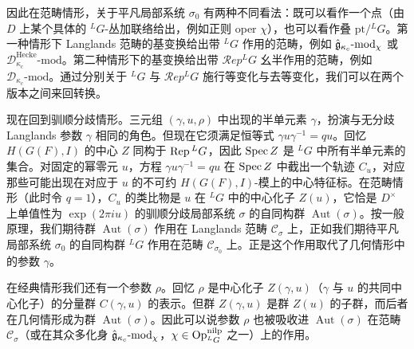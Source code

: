 因此在范畴情形，关于平凡局部系统 $\sigma_0$ 有两种不同看法：既可以看作一个点（由 $D$ 上某个具体的 ${}^L G$-丛加联络给出，例如正则 oper $\chi$），也可以看作叠 $\mathrm{pt}/{}^L G$。第一种情形下 Langlands 范畴的基变换给出带 ${}^L G$ 作用的范畴，例如 $\hat{\mathfrak{g}}_{\kappa_c}\text{-}\mathrm{mod}_\chi$ 或 $\mathcal{D}^{\mathrm{Hecke}}_{\kappa_c}\text{-}\mathrm{mod}$。第二种情形下的基变换给出带 $\mathcal{R}ep{}^L G$ 幺半作用的范畴，例如 $\mathcal{D}_{\kappa_c}\text{-}\mathrm{mod}$。通过分别关于 ${}^L G$ 与 $\mathcal{R}ep{}^L G$ 施行等变化与去等变化，我们可以在两个版本之间来回转换。

现在回到驯顺分歧情形。三元组 $(\gamma,u,\rho)$ 中出现的半单元素 $\gamma$，扮演与无分歧 Langlands 参数 $\gamma$ 相同的角色。但现在它须满足恒等式 $\gamma u\gamma^{-1}=qu$。回忆 $H(G(F),I)$ 的中心 $Z$ 同构于 $\operatorname{Rep}{}^L G$，因此 $\operatorname{Spec} Z$ 是 ${}^L G$ 中所有半单元素的集合。对固定的幂零元 $u$，方程 $\gamma u\gamma^{-1}=qu$ 在 $\operatorname{Spec} Z$ 中截出一个轨迹 $C_u$，对应那些可能出现在对应于 $u$ 的不可约 $H(G(F),I)$-模上的中心特征标。在范畴情形（此时令 $q=1$），$C_u$ 的类比物是 $u$ 在 ${}^L G$ 中的中心化子 $Z(u)$，它恰是 $D^\times$ 上单值性为 $\exp(2\pi iu)$ 的驯顺分歧局部系统 $\sigma$ 的自同构群 $\operatorname{Aut}(\sigma)$。按一般原理，我们期待群 $\operatorname{Aut}(\sigma)$ 作用在 Langlands 范畴 $\mathcal{C}_\sigma$ 上，正如我们期待平凡局部系统 $\sigma_0$ 的自同构群 ${}^L G$ 作用在范畴 $\mathcal{C}_{\sigma_0}$ 上。正是这个作用取代了几何情形中的参数 $\gamma$。

在经典情形我们还有一个参数 $\rho$。回忆 $\rho$ 是中心化子 $Z(\gamma,u)$（$\gamma$ 与 $u$ 的共同中心化子）的分量群 $C(\gamma,u)$ 的表示。但群 $Z(\gamma,u)$ 是群 $Z(u)$ 的子群，而后者在几何情形成为群 $\operatorname{Aut}(\sigma)$。因此可以说参数 $\rho$ 也被吸收进 $\operatorname{Aut}(\sigma)$ 在范畴 $\mathcal{C}_\sigma$（或在其众多化身 $\hat{\mathfrak{g}}_{\kappa_c}\text{-}\mathrm{mod}_\chi$，$\chi\in\operatorname{Op}^{\mathrm{nilp}}_{{}^L G}$ 之一）上的作用。

